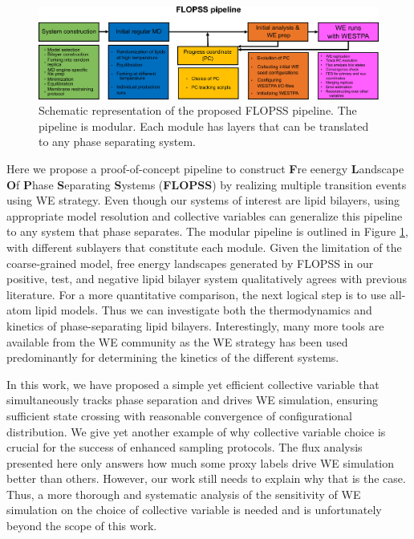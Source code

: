 \documentclass{biophys-new}
\begin{document}
\begin{figure}[hbt!]
\centering
\includegraphics[width=1\linewidth]{Figures/Main/8/placeholder.jpg}
\caption{Schematic representation of the proposed FLOPSS pipeline. The pipeline is modular. Each module has layers that can be translated to any phase separating system.}
\label{figs8:view}
\end{figure}

Here we propose a proof-of-concept pipeline to construct \textbf{F}re eenergy \textbf{L}andscape \textbf{O}f \textbf{P}hase \textbf{S}eparating \textbf{S}ystems (\textbf{FLOPSS}) by realizing multiple transition events using WE strategy.
Even though our systems of interest are lipid bilayers, using appropriate model resolution and collective variables can generalize this pipeline to any system that phase separates.
The modular pipeline is outlined in Figure \ref{figs8:view}, with different sublayers that constitute each module.
Given the limitation of the coarse-grained model, free energy landscapes generated by FLOPSS in our positive, test, and negative lipid bilayer system qualitatively agrees with previous literature.
For a more quantitative comparison, the next logical step is to use all-atom lipid models.
Thus we can investigate both the thermodynamics and kinetics of phase-separating lipid bilayers.
Interestingly, many more tools are available from the WE community as the WE strategy has been used predominantly for determining the kinetics of the different systems.

In this work, we have proposed a simple yet efficient collective variable that simultaneously tracks phase separation and drives WE simulation, ensuring sufficient state crossing with reasonable convergence of configurational distribution. 
We give yet another example of why collective variable choice is crucial for the success of enhanced sampling protocols. 
The flux analysis presented here only answers how much some proxy labels drive WE simulation better than others.
However, our work still needs to explain why that is the case.
Thus, a more thorough and systematic analysis of the sensitivity of WE simulation on the choice of collective variable is needed and is unfortunately beyond the scope of this work.
\end{document}
